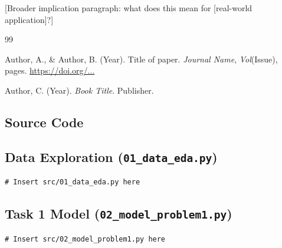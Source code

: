 \documentclass{mcmthesis}
\begin{document}
[Broader implication paragraph: what does this mean for [real-world application]?]


\begin{thebibliography}{99}

Author, A., \& Author, B. (Year). Title of paper. \textit{Journal Name}, \textit{Vol}(Issue), pages. \url{https://doi.org/...}

Author, C. (Year). \textit{Book Title}. Publisher.


\end{thebibliography}

\begin{appendices}

\section{Source Code}

\subsection{Data Exploration (\texttt{01\_data\_eda.py})}

\begin{lstlisting}[style=pythonstyle, caption={Data exploration and preprocessing.}]
# Insert src/01_data_eda.py here
\end{lstlisting}

\subsection{Task 1 Model (\texttt{02\_model\_problem1.py})}

\begin{lstlisting}[style=pythonstyle, caption={Task 1 model implementation.}]
# Insert src/02_model_problem1.py here
\end{lstlisting}

\end{appendices}
\end{document}
